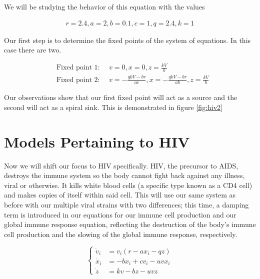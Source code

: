 \documentclass{article}
\begin{document}
We will be studying the behavior of this equation with the values

\begin{equation}
    \begin{split}
        r = 2.4, a = 2, b=0.1,c=1,q=2.4,k=1
    \end{split}
    \label{eq:vals}
\end{equation}

Our first step is to determine the fixed points of the system of equations. In this case there are two.

\begin{equation}
	\begin{split}
		&\text{Fixed point 1: } \quad v=0,x=0,z={\frac {kV}{b}} \\
		&\text{Fixed point 2: } \quad v=-{\frac {qkV-br}{ac}},x=-{\frac {qkV-br}{ab}},z={\frac {kV}{b}} 
	\end{split}
	\label{eq:fixed}
\end{equation}

Our observations show that our first fixed point will act as a source and the second will act as a spiral sink. This is demonstrated in figure \ref{fig:hiv2}


\section{Models Pertaining to HIV}

Now we will shift our focus to HIV specifically. HIV, the precursor to AIDS, destroys the immune system so the body cannot fight back against any illness, viral or otherwise. It kills white blood cells (a specific type known as a CD4 cell) and makes copies of itself within said cell. This will use our same system as before with our multiple viral strains with two differences; this time, a damping term is introduced in our equations for our immune cell production and our global immune response equation, reflecting the destruction of the body’s immune cell production and the slowing of the global immune response, respectively.

\begin{equation}
	\begin{cases}
		\dot v_i &= v_i (r-ax_i-qz)\\
		\dot x_i &= -bx_i + cv_i - uvx_i\\
		\dot z &= kv - bz - uvz
	\end{cases}
\end{equation}
\end{document}
